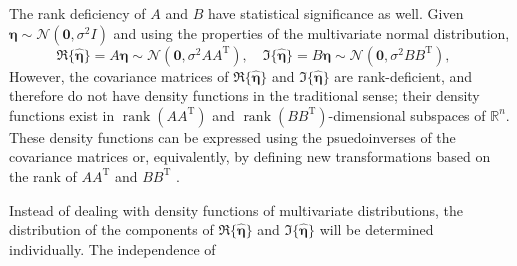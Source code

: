 \documentclass[12pt]{article}
\newcommand{\trans}{\mathrm{T}}	%
\newcommand{\rank}{\operatorname{rank}}	%
\newcommand{\noiseSD}{\sigma}	%
\newcommand{\noise}{\bm{\eta}}	%
\begin{document}
The rank deficiency of $A$ and $B$ have statistical significance as well.  Given $\noise \sim \mathcal{N}(\bm{0},\noiseSD^2I)$ and using the properties of the multivariate normal distribution, 
\begin{equation}
\Re\{\widehat{\noise}\} = A\noise \sim \mathcal{N}(\bm{0},\noiseSD^2 AA^\trans), \quad \Im\{\widehat{\noise}\} = B\noise \sim \mathcal{N}(\bm{0},\noiseSD^2 BB^\trans), \quad
\label{eq:Real and imaginary distributions}
\end{equation}
However, the covariance matrices of $\Re\{\widehat{\noise}\}$ and $\Im\{\widehat{\noise}\}$ are rank-deficient, and therefore do not have density functions in the traditional sense; their density functions exist in $\rank(AA^\trans)$ and $\rank(BB^\trans)$-dimensional subspaces of $\mathbb{R}^n$. These density functions can be expressed using the psuedoinverses of the covariance matrices or, equivalently, by defining new transformations based on the rank of $AA^\trans$ and $BB^\trans$ \cite{Rao1973}. \par 
Instead of dealing with density functions of multivariate distributions, the distribution of the components of $\Re\{\widehat{\noise}\}$ and $\Im\{\widehat{\noise}\}$ will be determined individually. The independence of 
\end{document}
